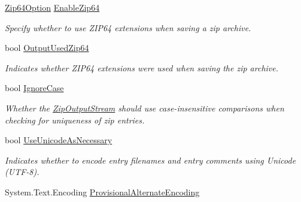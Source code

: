 \begin{DoxyCompactItemize}
\mbox{\hyperlink{namespace_super_tiled2_unity_1_1_ionic_1_1_zip_a0c873ba2a5b73de966e876643830dc69}{Zip64\+Option}} \mbox{\hyperlink{class_super_tiled2_unity_1_1_ionic_1_1_zip_1_1_zip_output_stream_a3e8855ff27cbafba7bb65b9839d6f803}{Enable\+Zip64}}
\begin{DoxyCompactList}\small\item\em Specify whether to use Z\+I\+P64 extensions when saving a zip archive. \end{DoxyCompactList}\item 
bool \mbox{\hyperlink{class_super_tiled2_unity_1_1_ionic_1_1_zip_1_1_zip_output_stream_aa1c7d8a2814a63a083a360a9b4b941e7}{Output\+Used\+Zip64}}
\begin{DoxyCompactList}\small\item\em Indicates whether Z\+I\+P64 extensions were used when saving the zip archive. \end{DoxyCompactList}\item 
bool \mbox{\hyperlink{class_super_tiled2_unity_1_1_ionic_1_1_zip_1_1_zip_output_stream_ad9c1b5d8e5d348c31ca8126649dd245c}{Ignore\+Case}}
\begin{DoxyCompactList}\small\item\em Whether the \mbox{\hyperlink{class_super_tiled2_unity_1_1_ionic_1_1_zip_1_1_zip_output_stream}{Zip\+Output\+Stream}} should use case-\/insensitive comparisons when checking for uniqueness of zip entries. \end{DoxyCompactList}\item 
bool \mbox{\hyperlink{class_super_tiled2_unity_1_1_ionic_1_1_zip_1_1_zip_output_stream_a4df145de0a4fefaadaa7e98a308ce1db}{Use\+Unicode\+As\+Necessary}}
\begin{DoxyCompactList}\small\item\em Indicates whether to encode entry filenames and entry comments using Unicode (U\+T\+F-\/8). \end{DoxyCompactList}\item 
System.\+Text.\+Encoding \mbox{\hyperlink{class_super_tiled2_unity_1_1_ionic_1_1_zip_1_1_zip_output_stream_aec3ac84c19c3f7c1c7ded0cf4ebba5cf}{Provisional\+Alternate\+Encoding}}

\end{DoxyCompactItemize}

